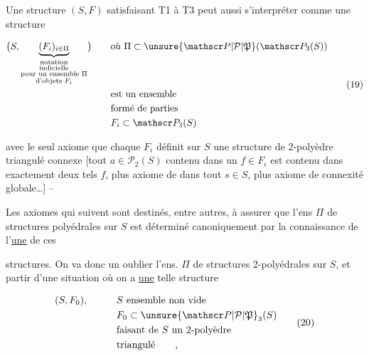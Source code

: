 Une structure $(S,F)$ satisfaisant T1 à T3 peut aussi s'interpréter comme une structure

\[
\begin{aligned}
 \bigl(S,\underbrace{(F_i)_{i\in\Pi}}_{\substack{\text{notation}\\\text{indicielle}\\\text{pour un ensemble }\Pi\\\text{d'objets }F_i}}\bigr)\qquad
 &\text{où }\Pi\subset\unsure{\mathscr P|\mathcal P|\mathfrak P}(\mathscr P_3(S))\\
 &\text{est un ensemble}\\
 &\text{formé de parties}\\
 &F_i\subset\mathscr P_3(S)
\end{aligned}\tag*{(19)}
\]

avec le seul axiome que chaque $F_i$ définit sur $S$ une structure de 2-polyèdre triangulé connexe [tout $a\in\mathscr P_2(S)$ contenu dans un $f\in F_i$ est contenu dans exactement deux tels $f$, plus axiome de  dans tout  $s\in S$, plus axiome de connexité globale\ldots] --


Les axiomes qui suivent sont destinés, entre autres, à assurer que  l'ens $\Pi$ de structures polyédrales sur $S$ est déterminé canoniquement par la connaissance de l'\uline{une} de ces

structures. On va donc  un   oublier l'ens. $\Pi$ de structures 2-polyédrales sur $S$, et  partir d'une situation où on a \uline{une} telle structure

\[
\begin{aligned}
 &(S,F_0),\qquad &&S\text{ ensemble non vide}\\
 &&&F_0\subset\unsure{\mathscr P|\mathcal P|\mathfrak P}_3(S)\\
 &&&\text{faisant de }S\text{ un 2-polyèdre}\\
 &&&\text{triangulé}\qquad,
\end{aligned}\tag*{(20)}
\]


